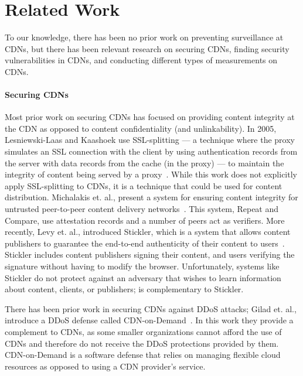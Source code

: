 \section{Related Work}
\label{sec:related}


To our knowledge, there has been no prior work on preventing surveillance at CDNs, but there 
has been relevant research on securing CDNs, finding security vulnerabilities in CDNs, and 
conducting different types of measurements on CDNs.

\paragraph{Securing CDNs} Most prior work on securing CDNs has focused on providing content 
integrity at the CDN as opposed to content confidentiality (and unlinkability).  In 2005, 
Lesniewski-Laas and Kaashoek use SSL-splitting --- a technique 
where the proxy simulates an SSL connection with the client by using authentication records from 
the server with data records from the cache (in the proxy) --- to maintain the 
integrity of content being served by a proxy~\cite{lesniewski2005ssl}.  While this work does not 
explicitly apply SSL-splitting to CDNs, it is a technique that could be used for content 
distribution.  Michalakis et. al., present a system for ensuring content integrity for untrusted 
peer-to-peer content delivery networks~\cite{michalakis2007ensuring}.  This system, Repeat and 
Compare, use attestation records and a number of peers act as verifiers.  More recently, Levy et. al., 
introduced Stickler, which is a system that allows content publishers to guarantee the end-to-end 
authenticity of their content to users~\cite{levy2015stickler}.  Stickler includes content publishers 
signing their content, and users verifying the signature without having to modify the browser.  Unfortunately, 
systems like Stickler do not protect against an adversary that wishes to learn information about content, clients, 
or publishers; \system{} is complementary to Stickler.

There has been prior work in securing CDNs against DDoS attacks; Gilad 
et. al., introduce a DDoS defense called CDN-on-Demand~\cite{gilad2016cdn}.  In this work they 
provide a complement to CDNs, as some smaller organizations cannot afford the use of CDNs and 
therefore do not receive the DDoS protections provided by them.  CDN-on-Demand is a software 
defense that relies on managing flexible cloud resources as opposed to using a CDN provider's 
service.\\

